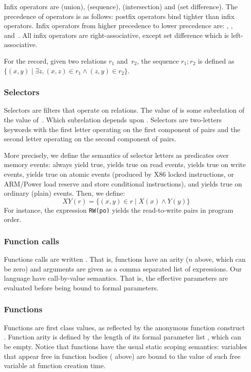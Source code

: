 Infix operators are \T{|} (union), \T{;} (sequence), \T{\&} (intersection)
and \T{\textbackslash} (set difference).
The precedence of operators is as follows:
postfix operators bind tighter than infix operators.
Infix operators from higher precedence to lower precedence are:
\T{\&}, \T{\textbackslash}, \T{;} and~\T{|}.
All infix operators are right-associative,
except set difference which is left-associative.


For the record, given two relations $r_1$ and~$r_2$,
the sequence $r_1; r_2$ is defined
as $\{ (x,y) \mid \exists z, (x,z) \in r_1 \wedge (z,y) \in r_2\}$.

\subsubsection*{Selectors}
Selectors are filters that operate on relations.
The value of  is some subrelation
of the value of~. Which subrelation depends upon
.
Selectors are two-letters keywords
with the first letter operating on the first component of pairs and
the second letter operating on the second component of pairs.

More precisely, we define the semantics of selector letters as
predicates over memory events:  always yield true,
 yields true on read events,
 yields true on write events,
 yields true on atomic events (produced by X86 locked instructions,
or ARM/Power load reserve and store conditional instructions),
and  yields true on ordinary (plain) events.
Then, we define:
$$
XY(r) = \{ (x,y) \in r \mid X(x) \wedge Y(y)\}
$$
For instance, the expression \verb+RW(po)+ yields the read-to-write pairs
in program order.

\subsubsection*{Function calls}
Functions calls are written
.
That is, functions have an arity ($n$ above, which can be zero)
and arguments are given as a comma separated list of expressions.
Our language have call-by-value semantics. That is,
the effective parameters
 are evaluated before
being bound to formal parameters.

\subsubsection*{Functions}
Functions are first class values, as reflected by the anonymous
function construct .
Function arity is defined by the length of its formal parameter list
, which can be empty.
Notice that functions have the usual static scoping semantics:
variables that appear free in function bodies 
( above) are bound to
the value of such free variable at function creation time.


